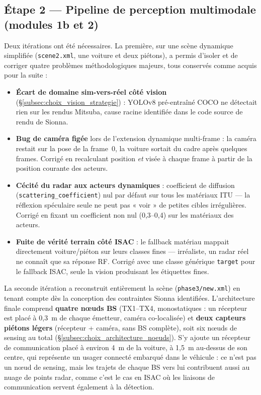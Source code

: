 \documentclass[12pt,a4paper,titlepage]{article}
\begin{document}
\subsection{Étape 2 --- Pipeline de perception multimodale (modules 1b et 2)}

Deux itérations ont été nécessaires. La première, sur une scène dynamique simplifiée (\texttt{scene2.xml}, une voiture et deux piétons), a permis d'isoler et de corriger quatre problèmes méthodologiques majeurs, tous conservés comme acquis pour la suite :

\begin{itemize}[leftmargin=1.5em]
    \item \textbf{Écart de domaine sim-vers-réel côté vision} (\S\ref{subsec:choix_vision_strategie}) : YOLOv8 pré-entraîné COCO ne détectait rien sur les rendus Mitsuba, cause racine identifiée dans le code source de rendu de Sionna.
    \item \textbf{Bug de caméra figée} lors de l'extension dynamique multi-frame : la caméra restait sur la pose de la frame~0, la voiture sortait du cadre après quelques frames. Corrigé en recalculant position \emph{et} visée à chaque frame à partir de la position courante des acteurs.
    \item \textbf{Cécité du radar aux acteurs dynamiques} : coefficient de diffusion (\texttt{scat\-ter\-ing\_co\-ef\-fi\-cient}) nul par défaut sur tous les matériaux ITU --- la réflexion spéculaire seule ne peut pas « voir » de petites cibles irrégulières. Corrigé en fixant un coefficient non nul (0,3--0,4) sur les matériaux des acteurs.
    \item \textbf{Fuite de vérité terrain côté ISAC} : le fallback matériau mappait directement voiture/piéton sur leurs classes fines --- irréaliste, un radar réel ne connaît que sa réponse RF. Corrigé avec une classe générique \texttt{target} pour le fallback ISAC, seule la vision produisant les étiquettes fines.
\end{itemize}

La seconde itération a reconstruit entièrement la scène (\texttt{phase3/new.xml}) en tenant compte dès la conception des contraintes Sionna identifiées. L'architecture finale comprend \textbf{quatre n\oe uds BS} (TX1--TX4, monostatiques : un récepteur est placé à 0,3~m de chaque émetteur, caméra co-localisée) et \textbf{deux capteurs piétons légers} (récepteur + caméra, sans BS complète), soit six n\oe uds de sensing au total (\S\ref{subsec:choix_architecture_noeuds}). S'y ajoute un récepteur de communication placé à environ 4~m de la voiture, à 1,5~m au-dessus de son centre, qui représente un usager connecté embarqué dans le véhicule : ce n'est pas un n\oe ud de sensing, mais les trajets de chaque BS vers lui contribuent aussi au nuage de points radar, comme c'est le cas en ISAC où les liaisons de communication servent également à la détection.
\end{document}
